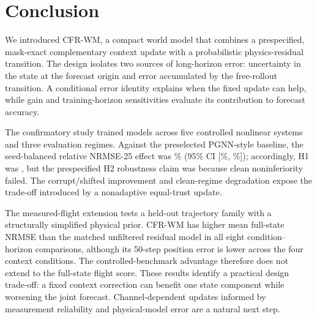 \section{Conclusion}

We introduced CFR-WM, a compact world model that combines a prespecified,
mask-exact complementary context update with a probabilistic
physics-residual transition. The design isolates two sources of long-horizon
error: uncertainty in the state at the forecast origin and error accumulated by
the free-rollout transition. A conditional error identity explains when the
fixed update can help, while gain and training-horizon sensitivities evaluate
its contribution to forecast accuracy.

The confirmatory study trained \ConfirmatoryRuns{} models across five
controlled nonlinear systems and three evaluation regimes. Against
the preselected PGNN-style baseline, the seed-balanced relative NRMSE-25 effect was
\PrimaryImprovement\% (95\% CI [\PrimaryRelativeCILow\%,
\PrimaryRelativeCIHigh\%]); accordingly, H1 was \PrimaryDecision, but the
prespecified H2 robustness claim was \RobustnessDecision{} because clean
noninferiority failed. The corrupt/shifted improvement and clean-regime
degradation expose the trade-off introduced by a nonadaptive equal-trust
update.

The measured-flight extension tests a held-out trajectory family with a
structurally simplified physical prior. CFR-WM has higher mean full-state NRMSE
than the matched unfiltered residual model in all eight condition--horizon
comparisons, although its 50-step position error is lower across the four
context conditions. The controlled-benchmark advantage therefore does not
extend to the full-state flight score. These results identify a practical
design trade-off: a fixed context correction can benefit one state component
while worsening the joint forecast. Channel-dependent updates informed by
measurement reliability and physical-model error are a natural next step.
